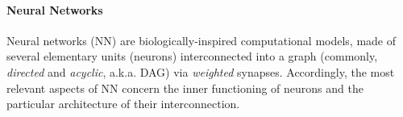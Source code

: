 \documentclass[12pt,a4paper,openright,twoside]{book}
\begin{document}
%

\paragraph{Neural Networks}

Neural networks (NN) are biologically-inspired computational models, made of several elementary units (neurons) interconnected into a graph (commonly, \emph{directed} and \emph{acyclic}, a.k.a. DAG) via \emph{weighted} synapses.
%
Accordingly, the most relevant aspects of NN concern the inner functioning of neurons and the particular architecture of their interconnection.
\end{document}
